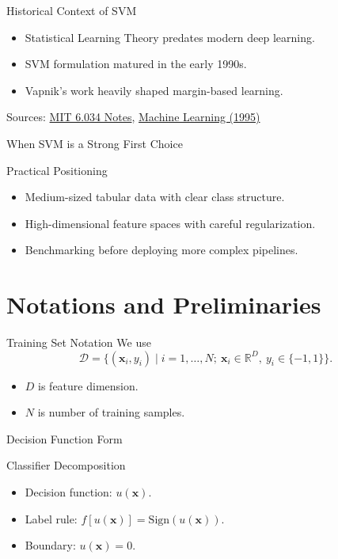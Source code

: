 \documentclass[10pt]{beamer}
\begin{document}
\begin{frame}{Historical Context of SVM}
  \justifying
  \begin{itemize}
    \item Statistical Learning Theory predates modern deep learning.
    \item SVM formulation matured in the early 1990s.
    \item Vapnik's work heavily shaped margin-based learning.
  \end{itemize}
  \vspace{0.4em}
  \footnotesize
  Sources: \href{https://web.mit.edu/6.034/wwwbob/svm-notes-long-08.pdf}{MIT 6.034 Notes},
  \href{https://link.springer.com/article/10.1023/A:1022627411411}{Machine Learning (1995)}
\end{frame}

\begin{frame}{When SVM is a Strong First Choice}
  \justifying
  \begin{examplebox}{Practical Positioning}
    \begin{itemize}
      \item Medium-sized tabular data with clear class structure.
      \item High-dimensional feature spaces with careful regularization.
      \item Benchmarking before deploying more complex pipelines.
    \end{itemize}
  \end{examplebox}
\end{frame}

\section{Notations and Preliminaries}

\begin{frame}{Training Set Notation}
  \justifying
  We use
  \[
    \mathcal{D} = \{(\bm{x}_i,y_i) \mid i=1,\ldots,N;\ \bm{x}_i\in\mathbb{R}^D,\ y_i\in\{-1,1\}\}.
  \]
  \begin{itemize}
    \item $D$ is feature dimension.
    \item $N$ is number of training samples.
  \end{itemize}
\end{frame}

\begin{frame}{Decision Function Form}
  \justifying
  \begin{conceptbox}{Classifier Decomposition}
    \begin{itemize}
      \item Decision function: $u(\bm{x})$.
      \item Label rule: $f[u(\bm{x})]=\mathrm{Sign}(u(\bm{x}))$.
      \item Boundary: $u(\bm{x})=0$.
    \end{itemize}
  \end{conceptbox}
\end{frame}
\end{document}
